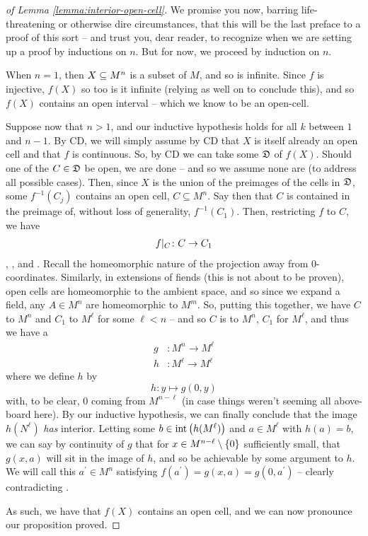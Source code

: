\begin{proof}[of Lemma \ref{lemma:interior-open-cell}]
  We promise you now, barring life-threatening or otherwise dire circumstances, that this will be the last preface to a proof of this sort -- and trust you, dear reader, to recognize when we are setting up a proof by inductions on $n$. But for now, we proceed by induction on $n$.
  
  When $n = 1$, then $X \subseteq M^{n}$ is a \inhb subset of $M$, and so is infinite. Since $f$ is injective, $f(X)$ so too is it infinite (relying as well on  to conclude this), and so $f(X)$ contains an open interval -- which we know to be an open-cell. 
  
  Suppose now that $n > 1$, and our inductive hypothesis holds for all $k$ between $1$ and $n -1$. By CD, we will simply assume by CD that $X$ is itself already an open cell and that $f$ is continuous. So, by CD we can take some \cd $\mathfrak{D}$ of $f(X)$. Should one of the $C \in \mathfrak{D}$ be open, we are done -- and so we assume none are (to address all possible cases). Then, since $X$ is the union of the preimages of the cells in $\mathfrak{D}$, some $f^{-1}(C_j)$ contains an open cell, $C \subseteq M^n$. Say then that $C$ is contained in the preimage of, without loss of generality, $f^{-1}(C_1)$. Then, restricting $f$ to $C$, we have
  \begin{align*}
    f \vert_{C} \colon C \to C_1
  \end{align*}
  \cont, , and \inj. Recall the homeomorphic nature of the projection away from 0-coordinates. Similarly, in extensions of fiends (this is not about to be proven), open cells are homeomorphic to the ambient space, and so since we expand a field, any $A \in M^n$ are  homeomorphic to $M^m$. So, putting this together, we have $C$ \homeom to $M^n$ and $C_1$ \homeom to $M^{\ell}$ for some $\ell < n$ -- and so $C$ is  \homeomic to $M^n$, $C_1$ for $M^{\ell}$, and thus we have a \cont {} \inj 
    \begin{align*}
      g &\colon M^n \to M^{\ell} \\
      h &\colon M^{\ell} \to M^{\ell}
    \end{align*}
    where we define $h$ by
    $$
      h \colon y \mapsto g(0, y)
    $$
    with, to be clear, $0$ coming from $M^{n - \ell}$ (in case things weren't seeming all above-board here). By our inductive hypothesis, we can finally conclude that the image $h(N^{\ell})$ \emph{has} interior. Letting some $b \in \operatorname{int}\left(h(M^{\ell})\right)$ and $a \in M^{\ell}$ with $h(a) = b$, we can say by continuity of $g$ that for $x \in M^{n - \ell} \setminus \{ 0 \}$ sufficiently small, that $g(x, a)$  will sit in the image of $h$, and so be achievable by some argument to $h$. We will call this $a^{\prime} \in M^n$ satisfying $f(a^{\prime}) = g(x, a) = g(0, a^{\prime})$ -- clearly contradicting \injtvty. 
    
    As such, we have that $f(X)$ contains an open cell, and we can now pronounce our proposition proved$.$ 
\end{proof}

